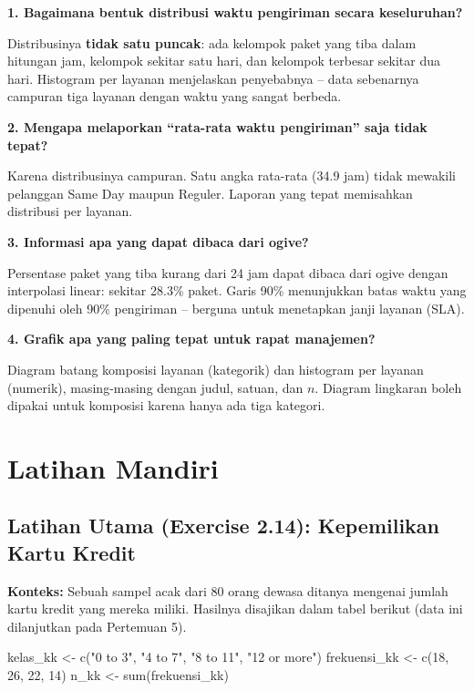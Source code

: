 \documentclass[
  indonesian,
  letterpaper,
]{book}
\newenvironment{Shaded}{\begin{snugshade}}{\end{snugshade}}
\newcommand{\DecValTok}[1]{\textcolor[rgb]{0.68,0.00,0.00}{#1}}
\newcommand{\FunctionTok}[1]{\textcolor[rgb]{0.28,0.35,0.67}{#1}}
\newcommand{\NormalTok}[1]{\textcolor[rgb]{0.00,0.23,0.31}{#1}}
\newcommand{\OtherTok}[1]{\textcolor[rgb]{0.00,0.23,0.31}{#1}}
\newcommand{\StringTok}[1]{\textcolor[rgb]{0.13,0.47,0.30}{#1}}
\begin{document}
\textbf{1. Bagaimana bentuk distribusi waktu pengiriman secara
keseluruhan?}

Distribusinya \textbf{tidak satu puncak}: ada kelompok paket yang tiba
dalam hitungan jam, kelompok sekitar satu hari, dan kelompok terbesar
sekitar dua hari. Histogram per layanan menjelaskan penyebabnya -- data
sebenarnya campuran tiga layanan dengan waktu yang sangat berbeda.

\textbf{2. Mengapa melaporkan ``rata-rata waktu pengiriman'' saja tidak
tepat?}

Karena distribusinya campuran. Satu angka rata-rata (34.9 jam) tidak
mewakili pelanggan Same Day maupun Reguler. Laporan yang tepat
memisahkan distribusi per layanan.

\textbf{3. Informasi apa yang dapat dibaca dari ogive?}

Persentase paket yang tiba kurang dari 24 jam dapat dibaca dari ogive
dengan interpolasi linear: sekitar 28.3\% paket. Garis 90\% menunjukkan
batas waktu yang dipenuhi oleh 90\% pengiriman -- berguna untuk
menetapkan janji layanan (SLA).

\textbf{4. Grafik apa yang paling tepat untuk rapat manajemen?}

Diagram batang komposisi layanan (kategorik) dan histogram per layanan
(numerik), masing-masing dengan judul, satuan, dan \(n\). Diagram
lingkaran boleh dipakai untuk komposisi karena hanya ada tiga kategori.

\section{Latihan Mandiri}\label{latihan-mandiri-3}

\subsection{Latihan Utama (Exercise 2.14): Kepemilikan Kartu
Kredit}\label{latihan-utama-exercise-2.14-kepemilikan-kartu-kredit}

\textbf{Konteks:} Sebuah sampel acak dari 80 orang dewasa ditanya
mengenai jumlah kartu kredit yang mereka miliki. Hasilnya disajikan
dalam tabel berikut (data ini dilanjutkan pada Pertemuan 5).

\begin{Shaded}
\begin{Highlighting}[]
\NormalTok{kelas\_kk }\OtherTok{\textless{}{-}} \FunctionTok{c}\NormalTok{(}\StringTok{"0 to 3"}\NormalTok{, }\StringTok{"4 to 7"}\NormalTok{, }\StringTok{"8 to 11"}\NormalTok{, }\StringTok{"12 or more"}\NormalTok{)}
\NormalTok{frekuensi\_kk }\OtherTok{\textless{}{-}} \FunctionTok{c}\NormalTok{(}\DecValTok{18}\NormalTok{, }\DecValTok{26}\NormalTok{, }\DecValTok{22}\NormalTok{, }\DecValTok{14}\NormalTok{)}
\NormalTok{n\_kk }\OtherTok{\textless{}{-}} \FunctionTok{sum}\NormalTok{(frekuensi\_kk)}
\end{Highlighting}
\end{Shaded}
\end{document}
